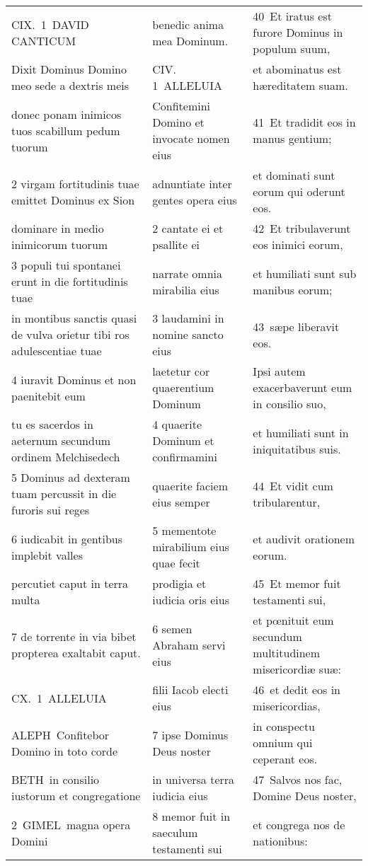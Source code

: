 \documentclass{article}
\begin{document}
\begin{longtable}{@{}p{}p{}p{}@{}}
CIX. 1 DAVID CANTICUM	&	benedic anima mea Dominum.	&	40 Et iratus est furore Dominus in populum suum,	\\
Dixit Dominus Domino meo sede a dextris meis	&	CIV. 1 ALLELUIA	&	et abominatus est hæreditatem suam.	\\
donec ponam inimicos tuos scabillum pedum tuorum	&	Confitemini Domino et invocate nomen eius	&	41 Et tradidit eos in manus gentium;	\\
2 virgam fortitudinis tuae emittet Dominus ex Sion	&	adnuntiate inter gentes opera eius	&	et dominati sunt eorum qui oderunt eos.	\\
dominare in medio inimicorum tuorum	&	2 cantate ei et psallite ei	&	42 Et tribulaverunt eos inimici eorum,	\\
3 populi tui spontanei erunt in die fortitudinis tuae	&	narrate omnia mirabilia eius	&	et humiliati sunt sub manibus eorum;	\\
in montibus sanctis quasi de vulva orietur tibi ros adulescentiae tuae	&	3 laudamini in nomine sancto eius	&	43 sæpe liberavit eos.	\\
4 iuravit Dominus et non paenitebit eum	&	laetetur cor quaerentium Dominum	&	Ipsi autem exacerbaverunt eum in consilio suo,	\\
tu es sacerdos in aeternum secundum ordinem Melchisedech	&	4 quaerite Dominum et confirmamini	&	et humiliati sunt in iniquitatibus suis.	\\
5 Dominus ad dexteram tuam percussit in die furoris sui reges	&	quaerite faciem eius semper	&	44 Et vidit cum tribularentur,	\\
6 iudicabit in gentibus implebit valles	&	5 mementote mirabilium eius quae fecit	&	et audivit orationem eorum.	\\
percutiet caput in terra multa	&	prodigia et iudicia oris eius	&	45 Et memor fuit testamenti sui,	\\
7 de torrente in via bibet propterea exaltabit caput.	&	6 semen Abraham servi eius	&	et pœnituit eum secundum multitudinem misericordiæ suæ:	\\
CX. 1 ALLELUIA	&	filii Iacob electi eius	&	46 et dedit eos in misericordias,	\\
ALEPH Confitebor Domino in toto corde	&	7 ipse Dominus Deus noster	&	in conspectu omnium qui ceperant eos.	\\
BETH in consilio iustorum et congregatione	&	in universa terra iudicia eius	&	47 Salvos nos fac, Domine Deus noster,	\\
2 GIMEL magna opera Domini	&	8 memor fuit in saeculum testamenti sui	&	et congrega nos de nationibus:	\\

\end{longtable}
\end{document}
